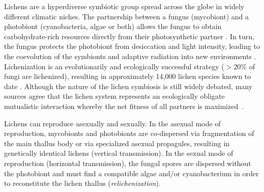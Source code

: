 \documentclass[runningheads,a4paper]{llncs}
\begin{document}
Lichens are a hyperdiverse symbiotic group spread across the globe in widely different climatic niches. The partnership between a fungus (mycobiont) and a photobiont (cyanobacteria, algae or both) allows the fungus to obtain carbohydrate-rich resources directly from their photosynthetic partner \cite{lutzoni2009lichens}. In turn, the fungus protects the photobiont from desiccation and light intensity, leading to the coevolution of the symbionts\cite{hill2009asymmetric}  and adaptive radiation into new environments \cite{nash1996lichen}. Lichenization is an evolutionarily and ecologically successful strategy ($>$20\% of fungi are lichenized), resulting in approximately 14,000 lichen species known to date \cite{lutzoni2009lichens,honegger1998lichen}. Although the nature of the lichen symbiosis is still widely debated, many sources agree that the lichen system represents an ecologically obligate mutualistic interaction whereby the net fitness of all partners is maximized~\cite{bronstein1994our,honegger1998lichen}.


Lichens can reproduce asexually and sexually\cite{nash1996lichen}. In the asexual mode of reproduction, mycobionts and photobionts are co-dispersed via fragmentation of the main thallus body or via specialized asexual propagules, resulting in genetically identical lichens (vertical transmission)\cite{nash1996lichen,dal2012vertical}. In the sexual mode of reproduction (horizontal transmission), the fungal spores are dispersed without the photobiont and must find a compatible algae and/or cyanobacterium in order to reconstitute the lichen thallus (\emph{relichenization}). 
\end{document}

